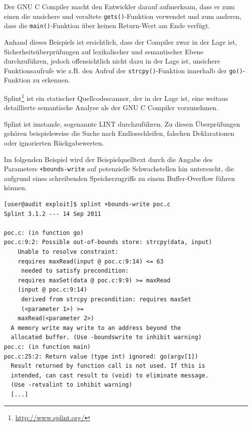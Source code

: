 Der GNU C Compiler macht den Entwickler darauf aufmerksam, dass er zum 
einen die unsichere und veraltete \texttt{gets()}-Funktion verwendet und 
zum anderen, dass die \texttt{main()}-Funktion über keinen Return-Wert am 
Ende verfügt.

Anhand dieses Beispiels ist ersichtlich, dass der Compiler zwar in der 
Lage ist, Sicherheitsüberprüfungen auf lexikalischer und semantischer 
Ebene durchzuführen, jedoch offensichtlich nicht dazu in der Lage ist, 
unsichere Funktionsaufrufe wie z.B. den Aufruf der \texttt{strcpy()}-Funktion 
innerhalb der \texttt{go()}-Funktion zu erkennen.


Splint\footnote{\url{http://www.splint.org/}} ist ein statischer Quellcodescanner, 
der in der Lage ist, eine weitaus detaillierte semantische Analyse als 
der GNU C Compiler vorzunehmen.

Splint ist imstande, sogenannte LINT \cite{lint_software} %
durchzuführen. Zu diesen Überprüfungen gehören beispielsweise die Suche 
nach Endlosschleifen, falschen Deklarationen oder ignorierten Rückgabewerten.

Im folgenden Beispiel wird der Beispielquelltext durch die Angabe des 
Parameters \texttt{+bounds-write} auf potenzielle Schwachstellen hin 
untersucht, die aufgrund eines schreibenden Speicherzugriffs zu einem 
Buffer-Overflow führen können.

\begin{lstlisting}[basicstyle=\ttfamily\footnotesize]
[user@audit exploit]$ splint +bounds-write poc.c
Splint 3.1.2 --- 14 Sep 2011

poc.c: (in function go)
poc.c:9:2: Possible out-of-bounds store: strcpy(data, input)
    Unable to resolve constraint:
    requires maxRead(input @ poc.c:9:14) <= 63
     needed to satisfy precondition:
    requires maxSet(data @ poc.c:9:9) >= maxRead
    (input @ poc.c:9:14)
     derived from strcpy precondition: requires maxSet
     (<parameter 1>) >=
    maxRead(<parameter 2>)
  A memory write may write to an address beyond the 
  allocated buffer. (Use -boundswrite to inhibit warning)
poc.c: (in function main)
poc.c:25:2: Return value (type int) ignored: go(argv[1])
  Result returned by function call is not used. If this is 
  intended, can cast result to (void) to eliminate message. 
  (Use -retvalint to inhibit warning)
  [...]
\end{lstlisting}

